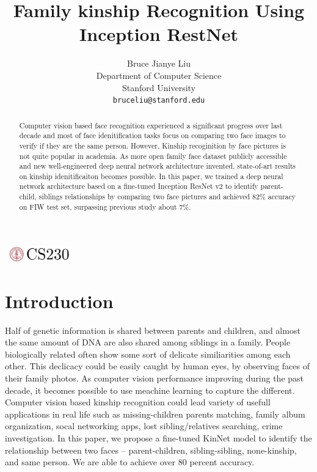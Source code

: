 \documentclass{article}
\title{Family kinship Recognition Using Inception RestNet}
\author{
  Bruce Jianye Liu\\
  Department of Computer Science\\
  Stanford University\\
  \texttt{bruceliu@stanford.edu} \\
}
\begin{document}

\begin{center}
\includegraphics[width=3cm, height=0.7cm]{CS230}
\end{center}

\maketitle

\begin{abstract}
Computer vision based face recognition experienced a significant progress over
last decade and most of face idenitification tasks focus on comparing two
face images to verify if they are the same person. However, Kinship
recoginition by face pictures is not quite popular in academia. As more
open family face dataset publicly accessible and new well-engineered deep
neural network architecture invented, state-of-art results on kinship
idenitificaiton becomes possible. In this paper, we trained a deep neural
network architecture based on a fine-tuned Inception ResNet v2 to identify
parent-child, siblings relationships by comparing two face pictures and
achieved 82\% accuracy on FIW test set, surpassing previous study about 7\%.
\end{abstract}

\section{Introduction}

Half of genetic information is shared between parents and children, and almost
the same amount of DNA are also shared among siblings in a family. People
biologically related often show some sort of delicate similiarities among each
other. This declicacy could be easily caught by human eyes, by observing faces
of their family photos. As computer vision performance improving during the
past decade, it becomes possible to use meachine learning to capture the
different. Computer vision based kinship recognition could lead variety of
usefull applications in real life such as missing-children parents matching,
family album organization, socal networking apps, lost sibling/relatives
searching, crime investigation.  In this paper, we propose a fine-tuned KinNet
model to identify the relationship between two faces -- parent-children,
sibling-sibling, none-kinship, and same person. We are able to achieve over 80
percent accuracy.
\end{document}
